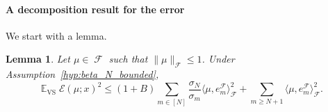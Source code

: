 \documentclass[twoside,11pt]{book}
\newtheorem{lemma}{Lemma}
\numberwithin{theorem}{chapter}
\numberwithin{definition}{chapter}
\numberwithin{proposition}{chapter}
\numberwithin{corollary}{chapter}
\numberwithin{example}{chapter}
\numberwithin{lemma}{chapter}
\DeclareMathOperator{\VS}{\mathrm{VS}}
\DeclareMathOperator{\EX}{\mathbb{E}}
\DeclareMathOperator{\F}{\mathcal{F}}
\newcommand{\rb}[1]{\textcolor{magenta}{#1}}
\begin{document}
\paragraph{A decomposition result for the error}
We start with a lemma.
\begin{lemma}\label{lemma:delayed_bounds}
Let $\mu \in \F$ such that $\|\mu\|_{\F} \leq 1$. Under Assumption~\ref{hyp:beta_N_bounded},
\begin{equation}\label{eq:EX_VS_slow_rates}
\EX_{\VS} \mathcal{E}(\mu;x)^{2} \leq (1+B) \sum\limits_{m \in [N]} \frac{\sigma_{N}}{\sigma_{m}} \langle \mu,e_{m}^{\F} \rangle_{\F}^{2} + \sum\limits_{m \geq N+1} \langle \mu,e_{m}^{\F} \rangle_{\F}^{2}.
\end{equation}
\end{lemma}
\end{document}
